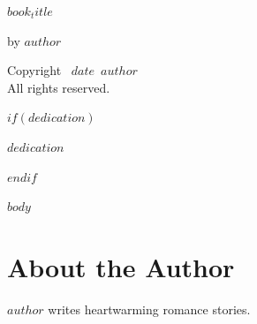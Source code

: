 \documentclass[12pt]{memoir}
\def\booktitle{$book_title$}
\def\bookauthor{$author$}
\def\bookdate{$date$}
\begin{document}
\thispagestyle{empty}
\begin{center}
\vspace*{1in}
{\HUGE\scshape\booktitle\par}
\vfill
{\large by \bookauthor}
\end{center}

\clearpage
\thispagestyle{empty}
\vspace*{\fill}
\begin{center}
Copyright \textcopyright\ \bookdate\ \bookauthor\\
All rights reserved.
\end{center}
\vspace*{\fill}

$if(dedication)$
\clearpage
\thispagestyle{empty}
\vspace*{3in}
\begin{center}
\textit{$dedication$}
\end{center}
$endif$

\clearpage
\tableofcontents

$body$

\clearpage
\chapter*{About the Author}

\bigskip
\textit{\bookauthor} writes heartwarming romance stories.
\end{document}
